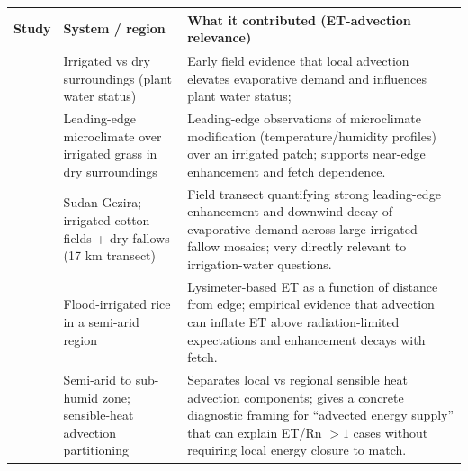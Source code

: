 \documentclass{article}
\begin{document}
    
    \begin{table}[htbp]
    \centering
    \renewcommand{\arraystretch}{1.15}
    \label{tab:advection_edge_links}
    \begin{tabular}{|p{3.0cm}|p{4.3cm}|p{6.5cm}|}
    \hline
    \textbf{Study} & \textbf{System / region} & \textbf{What it contributed (ET-advection relevance)}  \\
    \hline
    
    \hline
    
    \citet{millar1964effect} &
    Irrigated vs dry surroundings (plant water status) &
    Early field evidence that local advection elevates evaporative demand and influences plant water status;  \\
    
    \hline
    \citet{dyer_observations_1965} &
    Leading-edge microclimate over irrigated grass in dry surroundings &
     Leading-edge observations of microclimate modification (temperature/humidity profiles) over an irrigated patch; 
     supports near-edge enhancement and fetch dependence. \\
    \hline
    
    
    \citet{davenport_local_1967} &
    Sudan Gezira; irrigated cotton fields + dry fallows (17 km transect) &
    Field transect quantifying strong leading-edge enhancement and downwind decay of evaporative demand across large irrigated–fallow mosaics; very directly relevant to irrigation-water questions.\\
    \hline
    
    \citet{lang1974influence} &
    Flood-irrigated rice in a semi-arid region &
    Lysimeter-based ET as a function of distance from edge;  empirical evidence that advection can inflate ET above radiation-limited expectations and enhancement decays with fetch. \\
    \hline
    
    \citet{brakke1978local} &
    Semi-arid to sub-humid zone; sensible-heat advection partitioning &
    Separates local vs regional sensible heat advection components; gives a concrete diagnostic framing for “advected energy supply” that can explain ET/Rn $>1$ cases without requiring local energy closure to match. \\
    \hline
    \end{tabular}
    \end{table}
    
\end{document}
